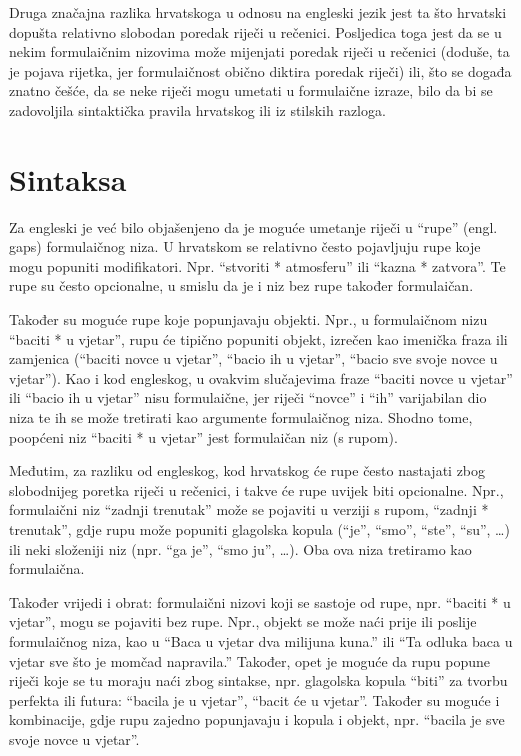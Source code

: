 \documentclass[12pt]{article}
\begin{document}
Druga značajna razlika hrvatskoga u odnosu na engleski jezik jest ta što hrvatski dopušta relativno
slobodan poredak riječi u rečenici. Posljedica toga jest da se u nekim formulaičnim nizovima može mijenjati
poredak riječi u rečenici (doduše, ta je pojava rijetka, jer formulaičnost obično diktira poredak riječi) ili, što
se događa znatno češće, da se neke riječi mogu umetati u formulaične izraze, bilo da bi se zadovoljila
sintaktička pravila hrvatskog ili iz stilskih razloga. 


\section*{Sintaksa}
Za engleski je već bilo objašenjeno da je moguće umetanje riječi u ``rupe'' (engl. gaps) formulaičnog niza. U
hrvatskom se relativno često pojavljuju rupe koje mogu popuniti modifikatori. Npr. ``stvoriti * atmosferu'' ili
``kazna * zatvora''. Te rupe su često opcionalne, u smislu da je i niz bez rupe također formulaičan.

Također su moguće rupe koje popunjavaju objekti. Npr., u formulaičnom nizu ``baciti * u vjetar'', rupu će
tipično popuniti objekt, izrečen kao imenička fraza ili zamjenica (``baciti novce u vjetar'', ``bacio ih u vjetar'',
``bacio sve svoje novce u vjetar''). Kao i kod engleskog, u ovakvim slučajevima fraze ``baciti novce u vjetar''
ili ``bacio ih u vjetar'' nisu formulaične, jer riječi ``novce'' i ``ih'' varijabilan dio niza te ih se može tretirati kao
argumente formulaičnog niza. Shodno tome, poopćeni niz ``baciti * u vjetar'' jest formulaičan niz (s
rupom).

Međutim, za razliku od engleskog, kod hrvatskog će rupe često nastajati zbog slobodnijeg poretka riječi u
rečenici, i takve će rupe uvijek biti opcionalne. Npr., formulaični niz ``zadnji trenutak'' može se pojaviti u
verziji s rupom, ``zadnji * trenutak'', gdje rupu može popuniti glagolska kopula (``je'', ``smo'', ``ste'', ``su'', …)
ili neki složeniji niz (npr. ``ga je'', ``smo ju'', …). Oba ova niza tretiramo kao formulaična.


Također vrijedi i obrat: formulaični nizovi koji se sastoje od rupe, npr. ``baciti * u vjetar'', mogu se pojaviti
bez rupe. Npr., objekt se može naći prije ili poslije formulaičnog niza, kao u ``Baca u vjetar dva milijuna
kuna.'' ili ``Ta odluka baca u vjetar sve što je momčad napravila.'' Također, opet je moguće da rupu popune
riječi koje se tu moraju naći zbog sintakse, npr. glagolska kopula ``biti'' za tvorbu perfekta ili futura: ``bacila
je u vjetar'', ``bacit će u vjetar''. Također su moguće i kombinacije, gdje rupu zajedno popunjavaju i
kopula i objekt, npr. ``bacila je sve svoje novce u vjetar''.
\end{document}
